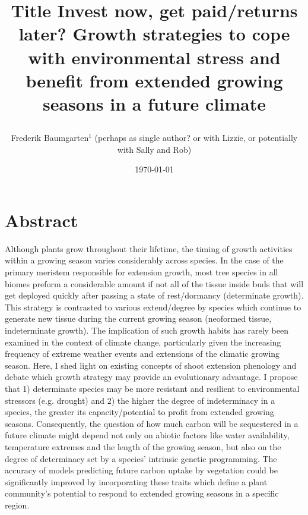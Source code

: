 \documentclass{article}
\begin{document}
\renewcommand{\bibname}{References}%



\title{Title
Invest now, get paid/returns later? Growth strategies to cope with environmental stress and benefit from extended growing seasons in a future climate %


} 


\date{\today}
\author{Frederik Baumgarten$^1$ (perhaps as single author? or with Lizzie, or potentially with Sally and Rob)}
\maketitle 

\section*{Abstract}

Although plants grow throughout their lifetime, the timing of growth activities within a growing season varies considerably across species. In the case of the primary meristem responsible for extension growth, most tree species in all biomes preform a considerable amount if not all of the tissue inside buds that will get deployed quickly after passing a state of rest/dormancy (determinate growth). This strategy is contrasted to various extend/degree by species which continue to generate new tissue during the current growing season (neoformed tissue, indeterminate growth). The implication of such growth habits has rarely been examined in the context of climate change, particularly given the increasing frequency of extreme weather events and extensions of the climatic growing season.  Here, I shed light on existing concepts of shoot extension phenology and debate which growth strategy may provide an evolutionary advantage. I propose that 1) determinate species may be more resistant and resilient to environmental stressors (e.g. drought) and 2) the higher the degree of indeterminacy in a species, the greater its capacity/potential to profit from extended growing seasons. Consequently, the question of how much carbon will be sequestered in a future climate might depend not only on abiotic factors like water availability, temperature extremes and the length of the growing season, but also on the degree of determinacy set by a species' intrinsic genetic programming. The accuracy of models predicting future carbon uptake by vegetation could be significantly improved by incorporating these traits which define a plant community's potential to respond to extended growing seasons in a specific region.
\\
\end{document}
